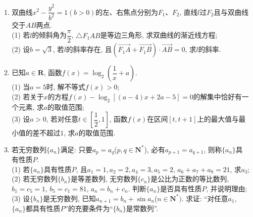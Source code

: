 \documentclass[10pt,a4paper]{article}
\begin{document}
\begin{enumerate}[1.]
\item 双曲线$x^2-\dfrac{y^2}{b^2}=1(b>0)$的左、右焦点分别为$F_1$、$F_2$, 直线$l$过$F_2$且与双曲线交于$AB$两点.\\
(1) 若$l$的倾斜角为$\dfrac{\pi }2$, $\triangle F_1AB$是等边三角形, 求双曲线的渐近线方程;\\
(2) 设$b=\sqrt 3$, 若$l$的斜率存在, 且$(\overrightarrow{F_1A}+\overrightarrow{F_1B})\cdot \overrightarrow{AB}=0$, 求$l$的斜率.
\item 已知$a\in \mathbf{R}$, 函数$f(x)=\log_2(\dfrac 1x+a)$.\\
(1) 当$a=5$时, 解不等式$f(x)>0$;\\
(2) 若关于$x$的方程$f(x)-\log_2[(a-4)x+2a-5]=0$的解集中恰好有一个元素, 求$a$的取值范围;\\
(3) 设$a>0$, 若对任意$t\in [\dfrac 12,1]$, 函数$f(x)$在区间$[t,t+1]$上的最大值与最小值的差不超过$1$, 求$a$的取值范围.
\item 若无穷数列$\{a_n\}$满足: 只要$a_p=a_q$($p,q\in \mathbf{N}^*$), 必有$a_{p+1}=a_{q+1}$, 则称$\{a_n\}$具有性质$P$.\\
(1) 若$\{a_n\}$具有性质$P$, 且$a_1=1,a_2=2,a_4=3,a_5=2$, $a_6+a_7+a_8=21$, 求$a_3$;\\
(2) 若无穷数列$\{b_n\}$是等差数列, 无穷数列$\{c_n\}$是公比为正数的等比数列, $b_1=c_5=1$, $b_5=c_1=81$, $a_n=b_n+c_n$. 判断$\{a_n\}$是否具有性质$P$, 并说明理由;\\
(3) 设$\{b_n\}$是无穷数列, 已知$a_{n+1}=b_n+\sin a_n$($n\in \mathbf{N}^*)$. 求证: ``对任意$a_1$, $\{a_n\}$都具有性质$P$''的充要条件为``$\{b_n\}$是常数列''.


\end{enumerate}





\iffalse










\fi
\end{document}
